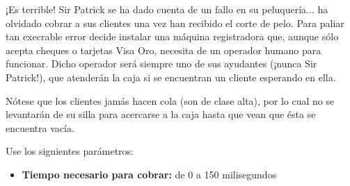 \documentclass[a4paper]{article}
\begin{document}
¡Es terrible! Sir Patrick se ha dado cuenta de un fallo en su peluquería... ha olvidado cobrar a sus clientes una vez han recibido el corte de pelo. Para paliar tan execrable error decide instalar una máquina registradora que, aunque sólo acepta cheques o tarjetas Visa Oro, necesita de un operador humano para funcionar. Dicho operador será siempre uno de sus ayudantes (¡nunca Sir Patrick!), que atenderán la caja si se encuentran un cliente esperando en ella.

Nótese que los clientes jamás hacen cola (son de clase alta), por lo cual no se levantarán de su silla para acercarse a la caja hasta que vean que ésta se encuentra vacía.

Use los siguientes parámetros:

\begin{itemize}
    \item \textbf{Tiempo necesario para cobrar:} de 0 a 150 milisegundos
\end{itemize}
\end{document}
